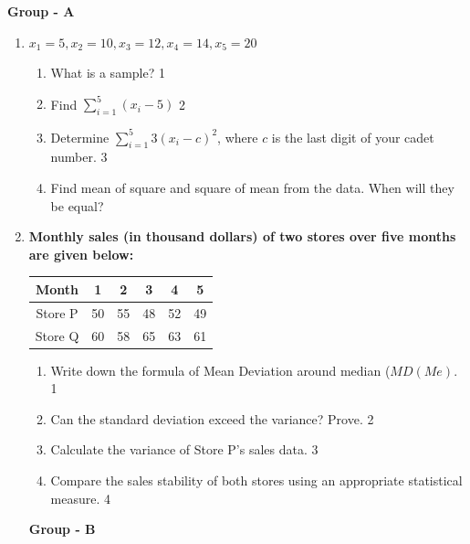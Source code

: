 \documentclass[12pt]{article}
\begin{document}
\begin{center}
\textbf{Group  - A}
\end{center}
 \begin{enumerate}
 
  \item
     \begin{center}
  \textbf{$x_1 = 5, x_2 = 10, x_3 = 12, x_4 = 14, x_5 = 20$}
  \end{center}
 
  \begin{enumerate}
    \item
	What is a sample? \hfill 1
    \item
    	Find $\displaystyle \sum_{i=1}^5 (x_i-5)$ \hfill 2
    \item
    	Determine $\displaystyle \sum_{i=1}^5 3(x_i-c)^2$, where $c$ is the last digit of your cadet number.   \hfill 3
     \item
     	Find mean of square and square of mean from the data. When will they be equal?
  \end{enumerate}
  
  \item  
  \textbf{Monthly sales (in thousand dollars) of two stores over five months are given below:}

\begin{table}[h]
\centering
\begin{tabular}{c|ccccc}
Month     & 1  & 2  & 3  & 4  & 5  \\ \hline
Store P  & 50 & 55 & 48 & 52 & 49 \\
Store Q  & 60 & 58 & 65 & 63 & 61
\end{tabular}
\end{table}

  \begin{enumerate}
     \item Write down the formula of Mean Deviation around median ($MD(Me)$. \hfill 1
     \item
	Can the standard deviation exceed the variance? Prove. \hfill 2
    \item  
	Calculate the variance of Store P’s sales data.  \hfill 3  
    \item  
	Compare the sales stability of both stores using an appropriate statistical measure.  \hfill 4  
\end{enumerate}  

  \begin{center}
\textbf{Group  - B}
\end{center}


\end{enumerate}
\end{document}
